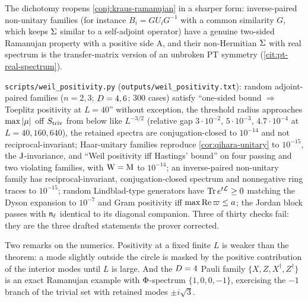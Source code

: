 The dichotomy reopens \cref{conj:kraus-ramanujan} in a sharper form: inverse-paired
non-unitary families (for instance $B_i = GU_iG^{-1}$ with a common similarity $G$, which
keeps $\Sigma$ similar to a self-adjoint operator) have a genuine two-sided Ramanujan
property with a positive side A, and their non-Hermitian $\Sigma$ with real spectrum is the
transfer-matrix version of an unbroken PT symmetry (\cref{cit:pt-real-spectrum}).

\begin{numerical}
\label{num:weil-positivity}
\texttt{scripts/weil\_positivity.py} (\texttt{outputs/weil\_positivity.txt}): random
adjoint-paired families ($n = 2,3$; $D = 4,6$; 300 cases) satisfy ``one-sided bound
$\Rightarrow$ Toeplitz positivity at $L = 40$'' without exception, the threshold radius
approaches $\max|\mu|$ off $S_{\mathrm{triv}}$ from below like $L^{-3/2}$ (relative gap
$3\cdot10^{-2}$, $5\cdot10^{-3}$, $4.7\cdot10^{-4}$ at $L = 40, 160, 640$), the retained
spectra are conjugation-closed to $10^{-14}$ and not reciprocal-invariant; Haar-unitary
families reproduce \cref{cor:qihara-unitary} to $10^{-15}$, the $\mathrm{J}$-invariance, and
``Weil positivity iff Hastings' bound'' on four passing and two violating families, with
$\mathrm{W} = \mathrm{M}$ to $10^{-14}$; an inverse-paired non-unitary family has reciprocal-invariant,
conjugation-closed spectrum and nonnegative ring traces to $10^{-15}$; random
Lindblad-type generators have $\operatorname{Tr} e^{t\mathcal L}\ge0$ matching the Dyson expansion to
$10^{-7}$ and Gram positivity iff $\max\operatorname{Re}\varpi\le a$; the Jordan block passes with
$\mathsf n_{\ell}$ identical to its diagonal companion. Three of thirty checks fail: they are the
three drafted statements the prover corrected.
\end{numerical}

Two remarks on the numerics. Positivity at a fixed finite $L$ is weaker than the theorem:
a mode slightly outside the circle is masked by the positive contribution of the interior
modes until $L$ is large. And the $D = 4$ Pauli family $\{X,Z,X^\dagger,Z^\dagger\}$ is an
exact Ramanujan example with $\Phi$-spectrum $\{1,0,0,-1\}$, exercising the $-1$ branch
of the trivial set with retained modes $\pm i\sqrt3$.

